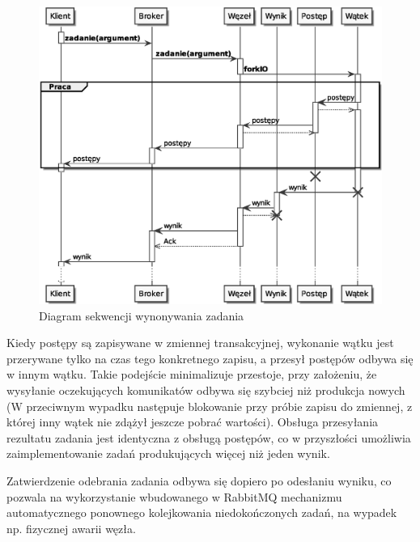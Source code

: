 \begin{figure}[h]
\includegraphics[width=\textwidth]{sekwencja}
\caption{Diagram sekwencji wynonywania zadania}
\end{figure}

Kiedy postępy są zapisywane w zmiennej transakcyjnej, wykonanie wątku jest przerywane tylko na czas tego konkretnego zapisu, a przesył postępów odbywa się w innym wątku. Takie podejście minimalizuje przestoje, przy założeniu, że wysyłanie oczekujących komunikatów odbywa się szybciej niż produkcja nowych (W przeciwnym wypadku następuje blokowanie przy próbie zapisu do zmiennej, z której inny wątek nie zdążył jeszcze pobrać wartości). Obsługa przesyłania rezultatu zadania jest identyczna z obsługą postępów, co w przyszłości umożliwia zaimplementowanie zadań produkujących więcej niż jeden wynik. 

Zatwierdzenie odebrania zadania odbywa się dopiero po odesłaniu wyniku, co pozwala na wykorzystanie wbudowanego w RabbitMQ mechanizmu automatycznego ponownego kolejkowania niedokończonych zadań, na wypadek np. fizycznej awarii węzła.

